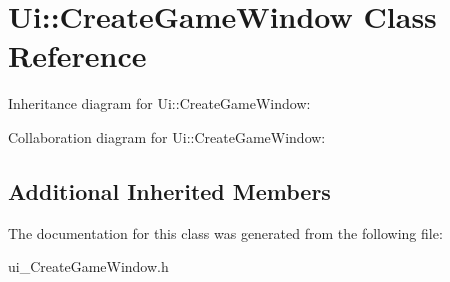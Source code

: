 \hypertarget{classUi_1_1CreateGameWindow}{}\section{Ui\+:\+:Create\+Game\+Window Class Reference}
\label{classUi_1_1CreateGameWindow}


Inheritance diagram for Ui\+:\+:Create\+Game\+Window\+:


Collaboration diagram for Ui\+:\+:Create\+Game\+Window\+:
\subsection*{Additional Inherited Members}


The documentation for this class was generated from the following file\+:\begin{DoxyCompactItemize}
\item 
ui\+\_\+\+Create\+Game\+Window.\+h\end{DoxyCompactItemize}
